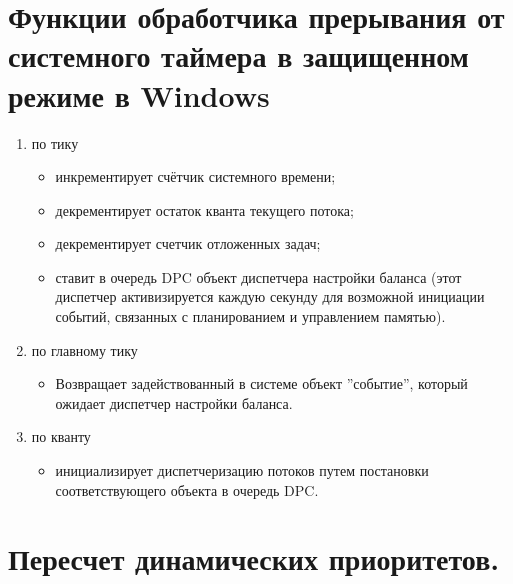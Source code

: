 \begin{figure}[ht!]
\end{figure}

\section{Функции обработчика прерывания от системного таймера в защищенном режиме в Windows}

\begin{enumerate}
	\item по тику
	      \begin{itemize}
		      \item инкрементирует счётчик системного времени;
		      \item декрементирует остаток кванта текущего потока;
		      \item декрементирует счетчик отложенных задач;
		      \item ставит в очередь DPC объект диспетчера настройки баланса
		            (этот диспетчер активизируется каждую секунду для возможной инициации событий,
		            связанных с планированием и управлением памятью).
	      \end{itemize}
	\item по главному тику
	      \begin{itemize}
		      \item Возвращает задействованный в системе объект ''событие'', который ожидает диспетчер настройки баланса.
	      \end{itemize}
	\item по кванту
	      \begin{itemize}
		      \item инициализирует диспетчеризацию потоков путем постановки соответствующего объекта в очередь DPC.
	      \end{itemize}
\end{enumerate}

\section{Пересчет динамических приоритетов.}

